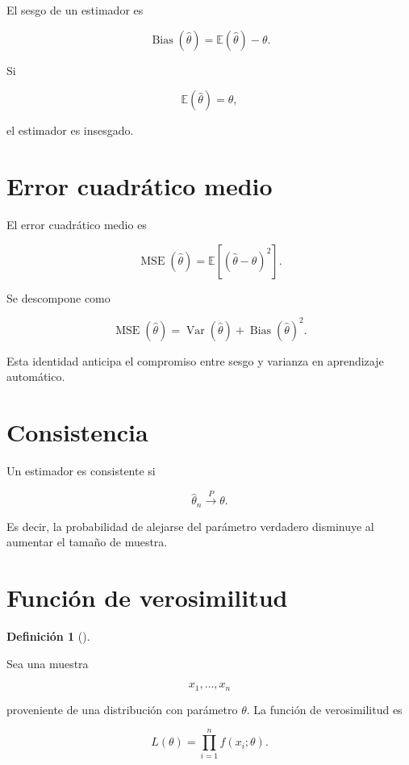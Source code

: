 \documentclass[
  spanish,
  10.5pt,
  letterpaper,
  DIV=11,
  numbers=noendperiod,
  oneside,
  open=any]{scrreprt}
\theoremstyle{definition}
\newtheorem{definition}{Definición}[chapter]
\theoremstyle{definition}
\theoremstyle{plain}
\theoremstyle{remark}
\begin{document}

El sesgo de un estimador es

\[
\operatorname{Bias}(\widehat{\theta})
=
\mathbb{E}(\widehat{\theta})-\theta.
\]

Si

\[
\mathbb{E}(\widehat{\theta})=\theta,
\]

el estimador es insesgado.

\section*{Error cuadrático medio}\label{error-cuadruxe1tico-medio}


El error cuadrático medio es

\[
\operatorname{MSE}(\widehat{\theta})
=
\mathbb{E}
\left[
(\widehat{\theta}-\theta)^2
\right].
\]

Se descompone como

\[
\operatorname{MSE}(\widehat{\theta})
=
\operatorname{Var}(\widehat{\theta})
+
\operatorname{Bias}(\widehat{\theta})^2.
\]

Esta identidad anticipa el compromiso entre sesgo y varianza en
aprendizaje automático.

\section*{Consistencia}\label{consistencia}


Un estimador es consistente si

\[
\widehat{\theta}_n
\overset{P}{\longrightarrow}
\theta.
\]

Es decir, la probabilidad de alejarse del parámetro verdadero disminuye
al aumentar el tamaño de muestra.

\section*{Función de verosimilitud}\label{funciuxf3n-de-verosimilitud}


\begin{definition}[]\protect\hypertarget{def-verosimilitud}{}\label{def-verosimilitud}

Sea una muestra

\[
x_1,\ldots,x_n
\]

proveniente de una distribución con parámetro \(\theta\). La función de
verosimilitud es

\[
L(\theta)
=
\prod_{i=1}^{n}
f(x_i;\theta).
\]

\end{definition}
\end{document}
